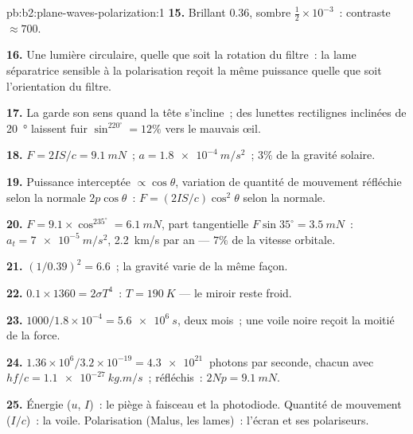 \begin{solution}{pb:b2:plane-waves-polarization:1}
\textbf{15.} Brillant $0.36$, sombre $\tfrac12 \times 10^{-3}$~: contraste $\approx 700$.

\textbf{16.} Une lumière circulaire, quelle que soit la rotation du filtre~: la
lame séparatrice sensible à la polarisation reçoit la même puissance quelle que soit l'orientation du
filtre.

\textbf{17.} La  garde son sens quand la tête
s'incline~; des lunettes rectilignes inclinées de \qty{20}{\degree} laissent fuir $\sin^220^\circ = 12\%$ vers
le mauvais œil.

\textbf{18.} $F = 2IS/c = \qty{9.1}{mN}$~; $a = \qty{1.8e-4}{m/s^2}$~; $3\%$ de la gravité
solaire.

\textbf{19.} Puissance interceptée $\propto\cos\theta$, variation de quantité de mouvement réfléchie
selon la normale $2p\cos\theta$~: $F = (2IS/c)\cos^2\theta$ selon la normale.

\textbf{20.} $F = 9.1 \times \cos^235^\circ = \qty{6.1}{mN}$, part tangentielle $F\sin35^\circ
= \qty{3.5}{mN}$~: $a_t = \qty{7e-5}{m/s^2}$, \qty{2.2}{km/s} par an --- $7\%$ de
la vitesse orbitale.

\textbf{21.} $(1/0.39)^2 = 6.6$~; la gravité varie de la même façon.

\textbf{22.} $0.1 \times 1360 = 2\sigma T^4$~: $T = \qty{190}{K}$ --- le miroir reste
froid.

\textbf{23.} $1000/1.8 \times 10^{-4} = \qty{5.6e6}{s}$, deux mois~; une voile noire
reçoit la moitié de la force.

\textbf{24.} $1.36 \times 10^6/3.2 \times 10^{-19} = \qty{4.3e21}{}$ photons par seconde,
chacun avec $hf/c = \qty{1.1e-27}{kg.m/s}$~; réfléchis~: $2Np = \qty{9.1}{mN}$.

\textbf{25.} Énergie ($u$, $I$)~: le piège à faisceau et la photodiode.
Quantité de mouvement ($I/c$)~: la voile. Polarisation (Malus, les lames)~: l'écran
et ses polariseurs.
\end{solution}
